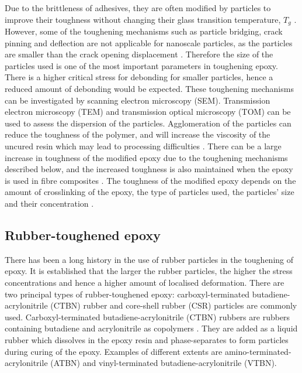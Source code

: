 \documentclass[numbers=noendperiod,chapterprefix=on]{icldt} %
\begin{document}
Due to the brittleness of adhesives, they are often modified by particles to improve their toughness without changing their glass transition temperature, $T_{g}$ \cite{Dittanet2012a}. However, some of the toughening mechanisms such as particle bridging, crack pinning and deflection are not applicable for nanoscale particles, as the particles are smaller than the crack opening displacement \cite{Dittanet2012a,Imanaka2001}. Therefore the size of the particles used is one of the most important parameters in toughening epoxy. There is a higher critical stress for debonding for smaller particles, hence a reduced amount of debonding would be expected. These toughening mechanisms can be investigated by scanning electron microscopy (SEM). Transmission electron microscopy (TEM) and transmission optical microscopy (TOM) \cite{Dittanet2012a} can be used to assess the dispersion of the particles. Agglomeration of the particles can reduce the toughness of the polymer, and will increase the viscosity of the uncured resin which may lead to processing difficulties \cite{Hsieh2010}. There can be a large increase in toughness of the modified epoxy due to the toughening mechanisms described below, and the increased toughness is also maintained when the epoxy is used in fibre composites \cite{Hsieh2010}. The toughness of the modified epoxy depends on the amount of crosslinking of the epoxy, the type of particles used, the particles' size and their concentration \cite{Hsieh2010}. 

\subsection{Rubber-toughened epoxy} 
There has been a long history in the use of rubber particles in the toughening of epoxy. It is established that the larger the rubber particles, the higher the stress concentrations \cite{Huang1992c} and hence a higher amount of localised deformation. There are two principal types of rubber-toughened epoxy: carboxyl-terminated butadiene-acrylonitrile (CTBN) rubber and core-shell rubber (CSR) particles are commonly used. 
Carboxyl-terminated butadiene-acrylonitrile (CTBN) rubbers are rubbers containing butadiene and acrylonitrile as copolymers \cite{Kinloch1983a,Giannakopoulos2011}. They are added as a liquid rubber which dissolves in the epoxy resin and phase-separates to form particles during curing of the epoxy. Examples of different extents are amino-terminated-acrylonitrile (ATBN) and vinyl-terminated butadiene-acrylonitrile (VTBN).  
\end{document}
